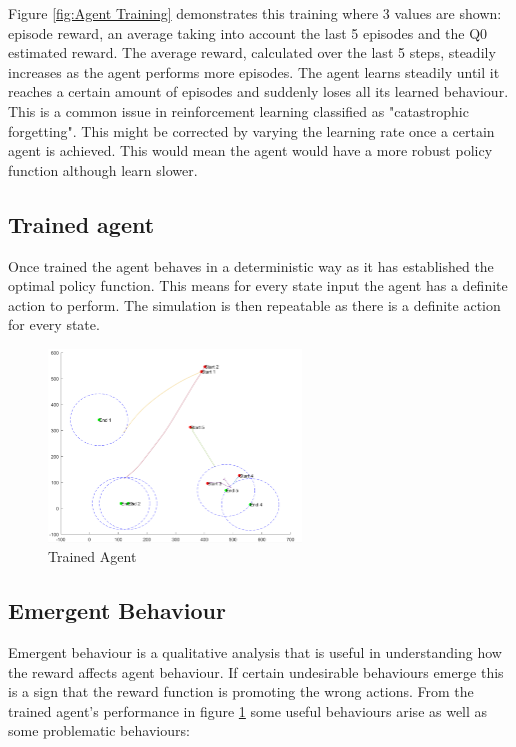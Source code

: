 Figure \ref{fig:Agent Training} demonstrates this training where 3 values are shown: episode reward, an average taking into account the last 5 episodes and the Q0 estimated reward. The average reward, calculated over the last 5 steps, steadily increases as the agent performs more episodes. The agent learns steadily until it reaches a certain amount of episodes and suddenly loses all its learned behaviour. This is a common issue in reinforcement learning classified as "catastrophic forgetting"\cite{cat1}. This might be corrected by varying the learning rate once a certain agent is achieved. This would mean the agent would have a more robust policy function although learn slower.

\subsection{Trained agent}
Once trained the agent behaves in a deterministic way as it has established the optimal policy function. This means for every state input the agent has a definite action to perform. The simulation is then repeatable as there is a definite action for every state. 

\begin{figure}[h]
  \begin{center}
    \includegraphics[width=0.6\textwidth]{figures/TrainedAgent.PNG}
    \end{center}
    \caption{Trained Agent}
    \label{fig:TrainedAgentFlocking}
\end{figure}

\subsection{Emergent Behaviour}
Emergent behaviour is a qualitative analysis that is useful in understanding how the reward affects agent behaviour. If certain undesirable behaviours emerge this is a sign that the reward function is promoting the wrong actions. From the trained agent’s performance in figure \ref{fig:TrainedAgentFlocking} some useful behaviours arise as well as some problematic behaviours:

